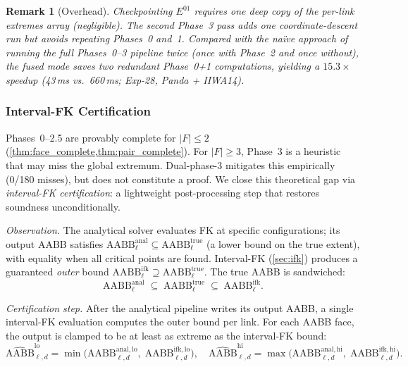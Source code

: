 \documentclass[journal]{IEEEtran}
\newtheorem{remark}{Remark}
\newcommand{\AABB}{\text{AABB}}
\begin{document}
\begin{remark}[Overhead]
Checkpointing $E^{01}$ requires one deep copy of the per-link
extremes array (negligible).
The second Phase~3 pass adds one coordinate-descent run but
\emph{avoids} repeating Phases~0 and~1.
Compared with the na\"ive approach of running the full Phases~0--3
pipeline twice (once with Phase~2 and once without), the fused
mode saves two redundant Phase~0+1 computations, yielding a
$15.3\times$ speedup (43\,ms vs.\ 660\,ms; Exp-28, Panda + IIWA14).
\end{remark}


\subsubsection{Interval-FK Certification}\label{sec:ifk_cert}

Phases~0--2.5 are provably complete for $|F|\leq 2$
(\cref{thm:face_complete,thm:pair_complete}).
For $|F|\geq 3$, Phase~3 is a heuristic that may miss the global
extremum.
Dual-phase-3 mitigates this empirically (0/180 misses), but does
not constitute a proof.
We close this theoretical gap via \emph{interval-FK certification}:
a lightweight post-processing step that restores soundness
unconditionally.

\emph{Observation.}
The analytical solver evaluates FK at specific configurations; its
output AABB satisfies
$\AABB^{\mathrm{anal}}_\ell \subseteq \AABB^{\mathrm{true}}_\ell$
(a lower bound on the true extent), with equality when all critical
points are found.
Interval-FK (\cref{sec:ifk}) produces a guaranteed \emph{outer}
bound
$\AABB^{\mathrm{ifk}}_\ell \supseteq \AABB^{\mathrm{true}}_\ell$.
The true AABB is sandwiched:
\begin{equation}\label{eq:sandwich}
  \AABB^{\mathrm{anal}}_\ell
  \;\subseteq\; \AABB^{\mathrm{true}}_\ell
  \;\subseteq\; \AABB^{\mathrm{ifk}}_\ell.
\end{equation}

\emph{Certification step.}
After the analytical pipeline writes its output AABB, a single
interval-FK evaluation computes the outer bound per link.
For each AABB face, the output is clamped to be at least as
extreme as the interval-FK bound:
\begin{equation}\label{eq:cert_clamp}
  \widehat{\AABB}_{\ell,d}^{\mathrm{lo}}
    = \min\!\bigl(\AABB_{\ell,d}^{\mathrm{anal,lo}},\;
                   \AABB_{\ell,d}^{\mathrm{ifk,lo}}\bigr),
  \quad
  \widehat{\AABB}_{\ell,d}^{\mathrm{hi}}
    = \max\!\bigl(\AABB_{\ell,d}^{\mathrm{anal,hi}},\;
                   \AABB_{\ell,d}^{\mathrm{ifk,hi}}\bigr).
\end{equation}
\end{document}
